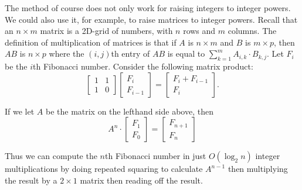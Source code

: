 \documentclass[11pt]{article}
\begin{document}
The method of course does not only work for raising integers to
integer powers.  We could also use it, for example, to raise matrices
to integer powers.  Recall that an $n\times m$ matrix is a 2D-grid of
numbers, with $n$ rows and $m$ columns.  The definition of
multiplication of matrices is that if $A$ is $n\times m$ and $B$ is
$m\times p$, then $AB$ is $n\times p$ where the $(i,j)$th entry of
$AB$ is equal to $\sum_{k=1}^m A_{i,k}\cdot B_{k,j}$.  
Let $F_i$ be the $i$th Fibonacci number.
Consider the following matrix product:
$$ \left[
\begin{array}{cc}
1 & 1 \\
1 & 0 
\end{array}\right ] \left[\begin{array}{c} F_i\\F_{i-1}\end{array}\right] =
\left[\begin{array}{c} F_i+F_{i-1}\\F_i\end{array}\right] .$$

If we let $A$ be the matrix on the lefthand side above, then
$$ A^n \cdot \left[\begin{array}{c} F_1\\F_{0}\end{array}\right] =
\left[\begin{array}{c} F_{n+1}\\F_n\end{array}\right]$$

Thus we can compute the $n$th Fibonacci number in just $O(\log_2 n)$
integer multiplications by doing repeated squaring to calculate
$A^{n-1}$ then multiplying the result by a $2\times 1$ matrix then
reading off the result.
\end{document}
